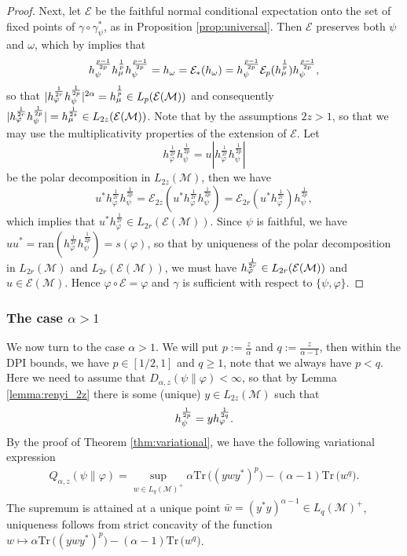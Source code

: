 \documentclass[12pt]{article}
\theoremstyle{definition}
\theoremstyle{remark}
\numberwithin{equation}{section}
\def\cE{\mathcal E}
\def\Me{\mathcal M}
\def \Tr{\mathrm{Tr}\,}
\def\ffi{\varphi}
\begin{document}
\begin{proof}
Next, let $\mathcal E$ be the faithful  normal conditional expectation onto the
set of fixed points of $\gamma\circ\gamma^*_\psi$, as in Proposition \ref{prop:universal}. Then
$\mathcal E$ preserves both $\psi$ and $\omega$, which by
\cite{junge2003noncommutative}   implies that 
\[
h_\psi^{p-1\over 2p}h_\mu^{\frac1p}h_\psi^{p-1\over 2p}=h_\omega=\mathcal
E_*(h_\omega)=h_\psi^{p-1\over 2p}\cE_p(h_\mu^{\frac1p})h_\psi^{p-1\over 2p},
\]
so that $|h_\ffi^{1\over 2r}h_\psi^{1\over 2p}|^{2\alpha}= h_\mu^{\frac1p}\in
L_p(\cE(\Me))$ and consequently $|h_\varphi^{\frac1{2r}}h_\psi^{\frac1{2p}}|=h_\mu^{1\over
2z}\in L_{2z}(\mathcal E(\Me))$.
Note that by the assumptions $2z>1$, so that we may use the multiplicativity properties
of the extension of $\mathcal E$. Let 
\[
h_\varphi^{\frac1{2r}}h_\psi^{\frac1{2p}}=u|h_\varphi^{\frac1{2r}}h_\psi^{\frac1{2p}}|
\]
be the polar decomposition in $L_{2z}(\Me)$, then we have 
\[
u^*h_\varphi^{\frac1{2r}}h_\psi^{\frac1{2p}}=\mathcal
E_{2z}(u^*h_\varphi^{\frac1{2r}}h_\psi^{\frac1{2p}})=\mathcal
E_{2r}(u^*h_\varphi^{\frac1{2r}})h_\psi^{\frac1{2p}},
\]
which implies that $u^*h_\varphi^{\frac1{2r}}\in L_{2r}(\cE(\Me))$. Since $\psi$ is
faithful, we have $uu^*=\mathrm{ran}(h_\varphi^{\frac1{2r}}h_\psi^{\frac1{2p}})=s(\ffi)$, so that by uniqueness of the polar decomposition in
$L_{2r}(\Me)$ and $L_{2r}(\cE(\Me))$, we
must have $h_\ffi^{1\over 2r}\in L_{2r}(\cE(\Me))$ and $u\in \cE(\Me)$.
Hence $\ffi\circ\mathcal E=\ffi$ and $\gamma$ is sufficient with respect to
$\{\psi,\varphi\}$. 

\end{proof}


\subsubsection{The case $\alpha>1$}

We now turn to the case $\alpha>1$. We will put $p:=\frac z\alpha$ and
$q:=\frac z{\alpha-1}$, then within the DPI bounds, we have $p\in [1/2,1]$ and $q\ge 1$,
note that we always have $p<q$. Here we need to assume that
$D_{\alpha,z}(\psi\|\ffi)<\infty$, so that by Lemma \ref{lemma:renyi_2z} there is some
(unique)  $y\in L_{2z}(\Me)$ such that
\[
h_{\psi}^{1\over 2p}=y h_\ffi^{1\over 2q}.
\]
By the proof of Theorem \ref{thm:variational}, we have the following variational
expression
\begin{align}\label{eq:variationalq}
Q_{\alpha,z}(\psi\|\varphi) =\sup_{w\in
L_q(\Me)^+}\alpha\Tr\bigl((ywy^*)^p\bigr)-(\alpha-1)\Tr \bigl(w^q\bigr).
\end{align}
 The supremum is attained at a unique point $\bar
w=(y^*y)^{\alpha-1}\in L_q(\Me)^+$, uniqueness follows from strict concavity of the
function $w\mapsto \alpha\Tr\bigl((ywy^*)^p\bigr)-(\alpha-1)\Tr\bigl( w^q\bigr)$.
\end{document}
